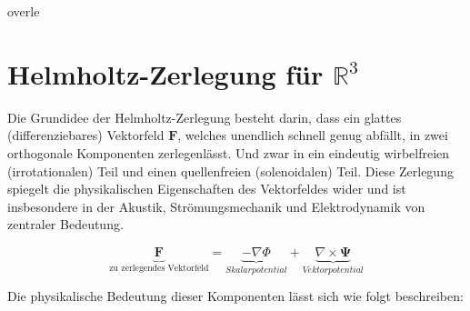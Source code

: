 overle%
%
%
%
\section{Helmholtz-Zerlegung für $\mathbb{R}^3$
\label{helmholtz:section:teil2}}

Die Grundidee der Helmholtz-Zerlegung besteht darin, dass ein glattes (differenziebares) Vektorfeld $\mathbf{F}$, welches unendlich schnell genug abfällt, in zwei orthogonale Komponenten zerlegenlässt. Und zwar in ein eindeutig wirbelfreien (irrotationalen) Teil und einen quellenfreien (solenoidalen) Teil. Diese Zerlegung spiegelt die physikalischen Eigenschaften des Vektorfeldes wider und ist insbesondere in der Akustik, Strömungsmechanik und Elektrodynamik von zentraler Bedeutung.

\begin{equation}
\underbrace{\mathbf{F}}_{\text{zu zerlegendes Vektorfeld}} =  \underbrace{-\nabla \Phi}_{Skalarpotential} + \underbrace{\nabla \times \mathbf{\Psi}}_{Vektorpotential}
\label{helmholtz:equationAllgemein}
\end{equation}

Die physikalische Bedeutung dieser Komponenten lässt sich wie folgt beschreiben:

